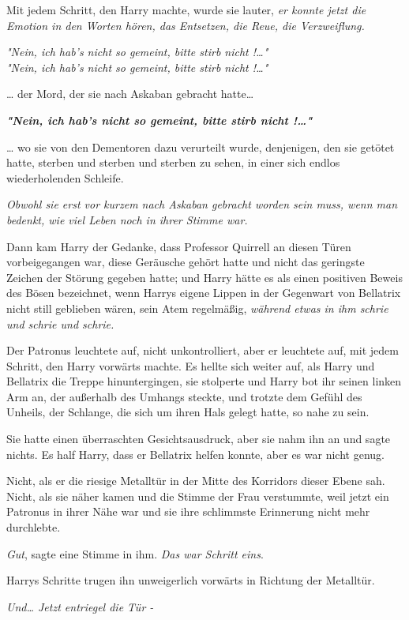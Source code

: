 {Mit jedem Schritt, den Harry machte, wurde sie lauter, \emph{er konnte jetzt die Emotion in den Worten hören, das Entsetzen, die Reue, die Verzweiflung.}

\emph{"Nein, ich hab's nicht so gemeint, bitte stirb nicht !…"\\ "Nein, ich hab's nicht so gemeint, bitte stirb nicht !…"}

… der Mord, der sie nach Askaban gebracht hatte…

\textbf{\emph{"Nein, ich hab's nicht so gemeint, bitte stirb nicht !…"}}

… wo sie von den Dementoren dazu verurteilt wurde, denjenigen, den sie getötet hatte, sterben und sterben und sterben zu sehen, in einer sich endlos wiederholenden Schleife.

\emph{Obwohl sie erst vor kurzem nach Askaban gebracht worden sein muss, wenn man bedenkt, wie viel Leben noch in ihrer Stimme war.}

Dann kam Harry der Gedanke, dass Professor Quirrell an diesen Türen vorbeigegangen war, diese Geräusche gehört hatte und nicht das geringste Zeichen der Störung gegeben hatte; und Harry hätte es als einen positiven Beweis des Bösen bezeichnet, wenn Harrys eigene Lippen in der Gegenwart von Bellatrix nicht still geblieben wären, sein Atem regelmäßig, \emph{während etwas in ihm schrie und schrie und schrie.}

Der Patronus leuchtete auf, nicht unkontrolliert, aber er leuchtete auf, mit jedem Schritt, den Harry vorwärts machte. Es hellte sich weiter auf, als Harry und Bellatrix die Treppe hinuntergingen, sie stolperte und Harry bot ihr seinen linken Arm an, der außerhalb des Umhangs steckte, und trotzte dem Gefühl des Unheils, der Schlange, die sich um ihren Hals gelegt hatte, so nahe zu sein.

Sie hatte einen überraschten Gesichtsausdruck, aber sie nahm ihn an und sagte nichts. Es half Harry, dass er Bellatrix helfen konnte, aber es war nicht genug.

Nicht, als er die riesige Metalltür in der Mitte des Korridors dieser Ebene sah. Nicht, als sie näher kamen und die Stimme der Frau verstummte, weil jetzt ein Patronus in ihrer Nähe war und sie ihre schlimmste Erinnerung nicht mehr durchlebte.

\emph{Gut}, sagte eine Stimme in ihm. \emph{Das war Schritt eins}.

Harrys Schritte trugen ihn unweigerlich vorwärts in Richtung der Metalltür.

\emph{Und… Jetzt entriegel die Tür -}

}
